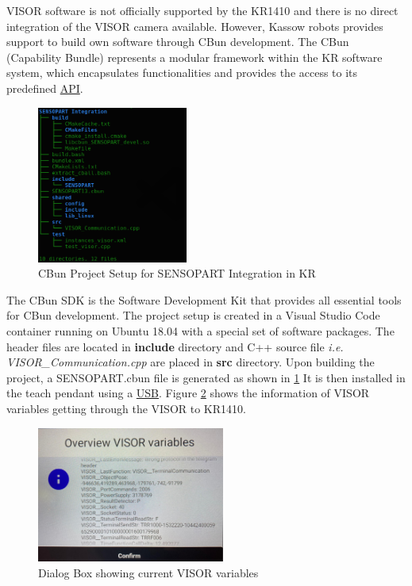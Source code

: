 VISOR software is not officially supported by the KR1410 and there is no direct integration of the VISOR camera available.
However, Kassow robots provides support to build own software through CBun development.
The CBun (Capability Bundle) represents a modular framework within the KR software system,
which encapsulates functionalities and provides the
access to its predefined \hyperref[acro:API]{API}. 


\begin{figure}[h]
    \centering
    \includegraphics[width=0.44\textwidth]{figures/sensopart-development.png}
    \caption{CBun Project Setup for SENSOPART Integration in KR}
    \label{fig:sensopart-development}
\end{figure}


The CBun SDK is the Software Development Kit that provides all essential tools
for CBun development. The project setup is created in a Visual Studio Code container
running on Ubuntu 18.04 with a special set of software packages. \cite{Cbun}
The header files are located in \textbf{include} directory and C++ source file \textit{i.e.}     \textit{VISOR\_Communication.cpp}
are placed in \textbf{src} directory.
Upon building the project, a SENSOPART.cbun file is generated as shown in \ref{fig:sensopart-development}
It is then installed in the teach pendant using a \hyperref[acro:USB]{USB}. Figure \ref{fig:cbun-variables}
shows the information of VISOR variables getting through the VISOR to KR1410.

\begin{figure}[h]
    \centering
    \includegraphics[width=0.55\textwidth]{figures/visor-cbun-connection.png}
    \caption{Dialog Box showing current VISOR variables}
    \label{fig:cbun-variables}
\end{figure}

